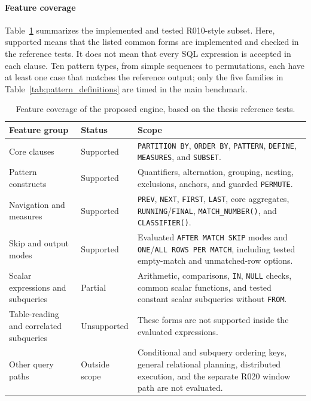 \documentclass[preprint,12pt,times,a4paper]{elsarticle}
\begin{document}
\paragraph{Feature coverage}
Table~\ref{tab:paper_feature_coverage} summarizes the implemented and tested
R010-style subset. Here, supported means that the listed common forms are
implemented and checked in the reference tests. It does not mean that every
SQL expression is accepted in each clause. Ten pattern
types, from simple sequences to permutations, each have at least one case
that matches the reference output; only the five families in
Table~\ref{tab:pattern_definitions} are timed in the main benchmark.

\begin{table}[htbp]
\centering\footnotesize

\begin{tabularx}{\textwidth}{>{\raggedright\arraybackslash}p{}
  >{\raggedright\arraybackslash}p{}X}
\toprule
\textbf{Feature group} & \textbf{Status} & \textbf{Scope} \\
\midrule
Core clauses & Supported & \texttt{PARTITION BY}, \texttt{ORDER BY},
  \texttt{PATTERN}, \texttt{DEFINE}, \texttt{MEASURES}, and \texttt{SUBSET}. \\
Pattern constructs & Supported & Quantifiers, alternation, grouping,
  nesting, exclusions, anchors, and guarded \texttt{PERMUTE}. \\
Navigation and measures & Supported & \texttt{PREV}, \texttt{NEXT},
  \texttt{FIRST}, \texttt{LAST}, core aggregates, \texttt{RUNNING}/\texttt{FINAL},
  \texttt{MATCH\_NUMBER()}, and \texttt{CLASSIFIER()}. \\
Skip and output modes & Supported & Evaluated \texttt{AFTER MATCH SKIP}
  modes and \texttt{ONE}/\texttt{ALL ROWS PER MATCH}, including tested
  empty-match and unmatched-row options. \\
Scalar expressions and subqueries & Partial & Arithmetic, comparisons,
  \texttt{IN}, \texttt{NULL} checks, common scalar functions, and tested
  constant scalar subqueries without \texttt{FROM}. \\
Table-reading and correlated subqueries & Unsupported & These forms are
  not supported inside the evaluated expressions. \\
Other query paths & Outside scope & Conditional and subquery ordering
  keys, general relational planning, distributed execution, and the
  separate R020 window path are not evaluated. \\
\bottomrule
\end{tabularx}
\caption{Feature coverage of the proposed engine, based on the thesis reference tests.}
\label{tab:paper_feature_coverage}
\end{table}
\end{document}
